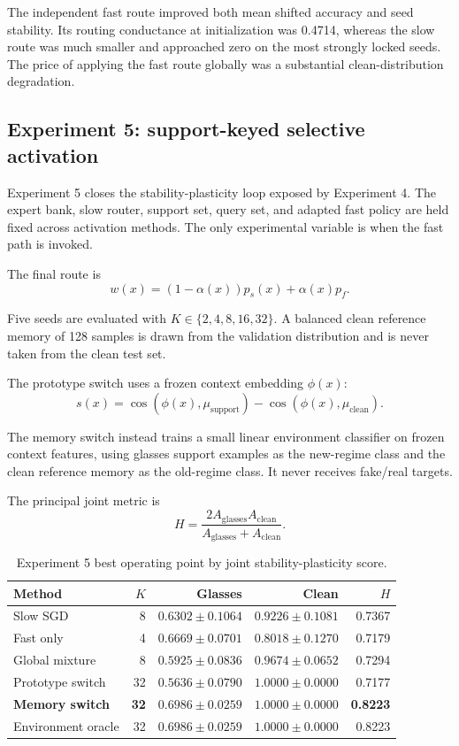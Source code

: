 \documentclass[10pt]{article}
\begin{document}
The independent fast route improved both mean shifted accuracy and seed stability. Its routing conductance at initialization was 0.4714, whereas the slow route was much smaller and approached zero on the most strongly locked seeds. The price of applying the fast route globally was a substantial clean-distribution degradation.

\subsection{Experiment 5: support-keyed selective activation}

Experiment 5 closes the stability-plasticity loop exposed by Experiment 4. The expert bank, slow router, support set, query set, and adapted fast policy are held fixed across activation methods. The only experimental variable is when the fast path is invoked.

The final route is
\[
w(x)=(1-\alpha(x))p_s(x)+\alpha(x)p_f.
\]

Five seeds are evaluated with $K\in\{2,4,8,16,32\}$. A balanced clean reference memory of 128 samples is drawn from the validation distribution and is never taken from the clean test set.

The prototype switch uses a frozen context embedding $\phi(x)$:
\[
s(x)=
\cos(\phi(x),\mu_{\mathrm{support}})
-
\cos(\phi(x),\mu_{\mathrm{clean}}).
\]

The memory switch instead trains a small linear environment classifier on frozen context features, using glasses support examples as the new-regime class and the clean reference memory as the old-regime class. It never receives fake/real targets.

The principal joint metric is
\[
H=
\frac{2A_{\mathrm{glasses}}A_{\mathrm{clean}}}
{A_{\mathrm{glasses}}+A_{\mathrm{clean}}}.
\]

\begin{table}[h]
\centering
\caption{Experiment 5 best operating point by joint stability-plasticity score.}
\begin{tabular}{lrrrr}
\toprule
Method & $K$ & Glasses & Clean & $H$ \\
\midrule
Slow SGD & 8 & $0.6302 \pm 0.1064$ & $0.9226 \pm 0.1081$ & 0.7367 \\
Fast only & 4 & $0.6669 \pm 0.0701$ & $0.8018 \pm 0.1270$ & 0.7179 \\
Global mixture & 8 & $0.5925 \pm 0.0836$ & $0.9674 \pm 0.0652$ & 0.7294 \\
Prototype switch & 32 & $0.5636 \pm 0.0790$ & $1.0000 \pm 0.0000$ & 0.7177 \\
\textbf{Memory switch} & \textbf{32} & $\mathbf{0.6986 \pm 0.0259}$ & $\mathbf{1.0000 \pm 0.0000}$ & \textbf{0.8223} \\
Environment oracle & 32 & $0.6986 \pm 0.0259$ & $1.0000 \pm 0.0000$ & 0.8223 \\
\bottomrule
\end{tabular}
\end{table}
\end{document}
